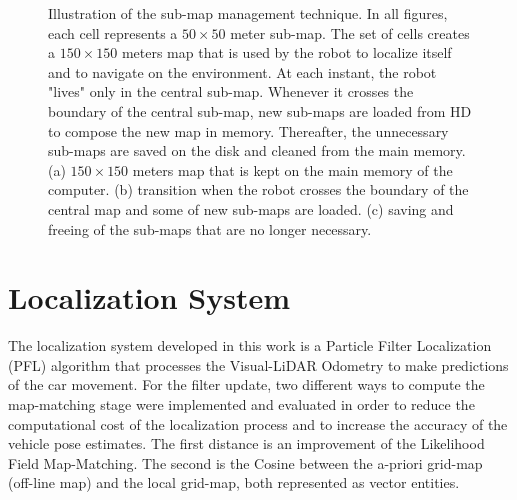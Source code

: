 \begin{figure}[t]
\centering
{}
\caption{Illustration of the sub-map management technique. In all figures, each cell represents a $50\times50$ meter sub-map. The set of cells creates a $150\times150$ meters map that is used by the robot to localize itself and to navigate on the environment. At each instant, the robot "lives" only in the central sub-map. Whenever it crosses the boundary of the central sub-map, new sub-maps are loaded from HD to compose the new map in memory. Thereafter, the unnecessary sub-maps are saved on the disk and cleaned from the main memory. (a) $150\times150$ meters map that is kept on the main memory of the computer. (b) transition when the robot crosses the boundary of the central map and some of new sub-maps are loaded. (c) saving and freeing of the sub-maps that are no longer necessary.}
\label{Fig::FIGURE05}
\end{figure}

\section{Localization System}

The localization system developed in this work is a Particle Filter Localization (PFL) algorithm that processes the Visual-LiDAR Odometry to make predictions of the car movement. For the filter update, two different ways to compute the map-matching stage were implemented and evaluated in order to reduce the computational cost of the localization process and to increase the accuracy of the vehicle pose estimates. The first distance is an improvement of the Likelihood Field Map-Matching. The second is the Cosine between the a-priori grid-map (off-line map) and the local grid-map, both represented as vector entities.

